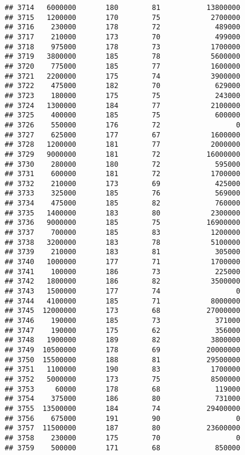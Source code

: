 \documentclass[
]{article}
\begin{document}
\begin{verbatim}
## 3714   6000000       180        81           13800000
## 3715   1200000       170        75            2700000
## 3716    230000       178        72             489000
## 3717    210000       173        70             499000
## 3718    975000       178        73            1700000
## 3719   3800000       185        78            5600000
## 3720    775000       185        77            1600000
## 3721   2200000       175        74            3900000
## 3722    475000       182        70             629000
## 3723    180000       175        75             243000
## 3724   1300000       184        77            2100000
## 3725    400000       185        75             600000
## 3726    550000       176        72                  0
## 3727    625000       177        67            1600000
## 3728   1200000       181        77            2000000
## 3729   9000000       181        72           16000000
## 3730    280000       180        72             595000
## 3731    600000       181        72            1700000
## 3732    210000       173        69             425000
## 3733    325000       185        76             569000
## 3734    475000       185        82             760000
## 3735   1400000       183        80            2300000
## 3736   9000000       185        75           16900000
## 3737    700000       185        83            1200000
## 3738   3200000       183        78            5100000
## 3739    210000       183        81             305000
## 3740   1000000       177        71            1700000
## 3741    100000       186        73             225000
## 3742   1800000       186        82            3500000
## 3743   1500000       177        74                  0
## 3744   4100000       185        71            8000000
## 3745  12000000       173        68           27000000
## 3746    190000       185        73             371000
## 3747    190000       175        62             356000
## 3748   1900000       189        82            3800000
## 3749  10500000       178        69           20000000
## 3750  15500000       188        81           29500000
## 3751   1100000       190        83            1700000
## 3752   5000000       173        75            8500000
## 3753     60000       178        68             119000
## 3754    375000       186        80             731000
## 3755  13500000       184        74           29400000
## 3756    675000       191        90                  0
## 3757  11500000       187        80           23600000
## 3758    230000       175        70                  0
## 3759    500000       171        68             850000

\end{verbatim}
\end{document}

